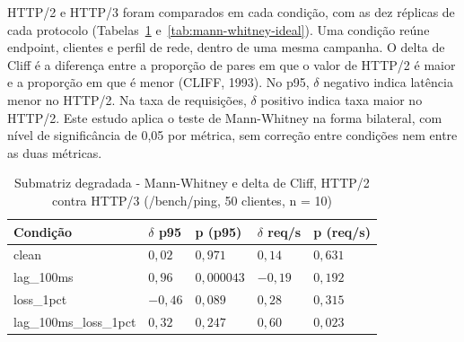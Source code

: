 HTTP/2 e HTTP/3 foram comparados em cada condição, com as dez réplicas de cada protocolo (Tabelas~\ref{tab:mann-whitney-submatriz} e~\ref{tab:mann-whitney-ideal}). Uma condição reúne endpoint, clientes e perfil de rede, dentro de uma mesma campanha. O delta de Cliff é a diferença entre a proporção de pares em que o valor de HTTP/2 é maior e a proporção em que é menor (CLIFF, 1993). No p95, $\delta$ negativo indica latência menor no HTTP/2. Na taxa de requisições, $\delta$ positivo indica taxa maior no HTTP/2. Este estudo aplica o teste de Mann-Whitney na forma bilateral, com nível de significância de 0,05 por métrica, sem correção entre condições nem entre as duas métricas.

\begin{table}[H]
\centering
\caption[Submatriz degradada - Mann-Whitney e delta de Cliff, HTTP/2 contra HTTP/3]{Submatriz degradada - Mann-Whitney e delta de Cliff, HTTP/2 contra HTTP/3 (/bench/ping, 50 clientes, n = 10)}\label{tab:mann-whitney-submatriz}
\footnotesize
\setlength{\tabcolsep}{3pt}
\begin{tabular}{@{}>{\raggedright\arraybackslash}p{36mm}>{\centering\arraybackslash}p{18mm}>{\centering\arraybackslash}p{28mm}>{\centering\arraybackslash}p{20mm}>{\centering\arraybackslash}p{28mm}@{}} \hline
\textbf{Condição} & \textbf{$\delta$ p95} & \textbf{p (p95)} & \textbf{$\delta$ req/s} & \textbf{p (req/s)} \\
\hline
clean & $0{,}02$ & $0{,}971$ & $0{,}14$ & $0{,}631$ \\
lag\_100ms & $0{,}96$ & $0{,}000043$ & $-0{,}19$ & $0{,}192$ \\
loss\_1pct & $-0{,}46$ & $0{,}089$ & $0{,}28$ & $0{,}315$ \\
lag\_\allowbreak 100ms\_\allowbreak loss\_\allowbreak 1pct & $0{,}32$ & $0{,}247$ & $0{,}60$ & $0{,}023$ \\
\hline
\end{tabular}
\end{table}

